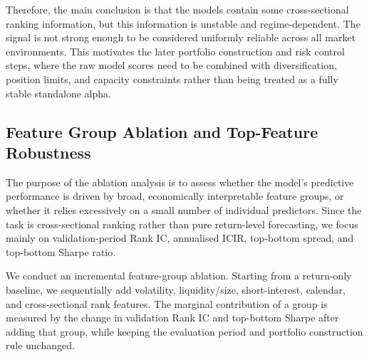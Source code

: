 \documentclass[12pt]{article}
\begin{document}
Therefore, the main conclusion is that the models contain some cross-sectional ranking information, but this information is unstable and regime-dependent. The signal is not strong enough to be considered uniformly reliable across all market environments. This motivates the later portfolio construction and risk control steps, where the raw model scores need to be combined with diversification, position limits, and capacity constraints rather than being treated as a fully stable standalone alpha.
\subsection{Feature Group Ablation and Top-Feature Robustness}

The purpose of the ablation analysis is to assess whether the model's predictive performance is driven by broad, economically interpretable feature groups, or whether it relies excessively on a small number of individual predictors. Since the task is cross-sectional ranking rather than pure return-level forecasting, we focus mainly on validation-period Rank IC, annualised ICIR, top-bottom spread, and top-bottom Sharpe ratio.

We conduct an incremental feature-group ablation. Starting from a return-only baseline, we sequentially add volatility, liquidity/size, short-interest, calendar, and cross-sectional rank features. The marginal contribution of a group is measured by the change in validation Rank IC and top-bottom Sharpe after adding that group, while keeping the evaluation period and portfolio construction rule unchanged.

\begin{table}[htbp]
\centering
\caption{Incremental feature-group ablation results}
\label{tab:feature_group_ablation}
\end{table}
\end{document}
